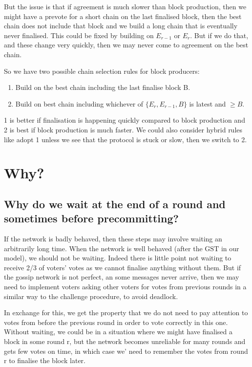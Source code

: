\documentclass{article}
\def\GST{\mathrm{GST}}
\begin{document}
But the issue is that if agreement is much slower than block production, then we might have a prevote for a short chain on the last finalised block, then the best chain does not include that block and we build a long chain that is eventually never finalised. This could be fixed by building on $E_{r-1}$ or $E_r$. But if we do that, and these change very quickly, then we may never come to agreement on the best chain. 

So we have two possible chain selection rules for block producers:

\begin{enumerate}
\item Build on the best chain including the last finalise block B.
\item Build on best chain including whichever of $\{E_r,E_{r-1},B\}$ is latest and $\geq B$.
\end{enumerate}

1 is better if finalisation is happening quickly compared to block production and 2 is best if block production is much faster. We could also consider hybrid rules like adopt 1 unless we see that the protocol is stuck or slow, then we switch to 2.

\section{Why?}

\subsection{Why do we wait at the end of a round and sometimes before precommitting?}

If the network  is badly behaved, then these steps may involve waiting an arbitrarily long time. When the network is well behaved (after the $\GST$ in our model), we should not be waiting. Indeed there is little point not waiting to receive 2/3 of voters' votes as we cannot finalise anything without them.
But if the gossip network is not perfect, an some messages never arrive, then we may need to implement voters asking other voters for votes from previous rounds in a similar way to the challenge procedure, to avoid deadlock.

In exchange for this, we get the property that we do not need to pay attention to votes from before the previous round in order to vote correctly in this one. Without waiting, we could be in a situation where we might have finalised a block in some round r, but the network becomes unreliable for many rounds and gets few votes on time, in which case we' need to remember the votes from round r to finalise the block later. 
\end{document}
